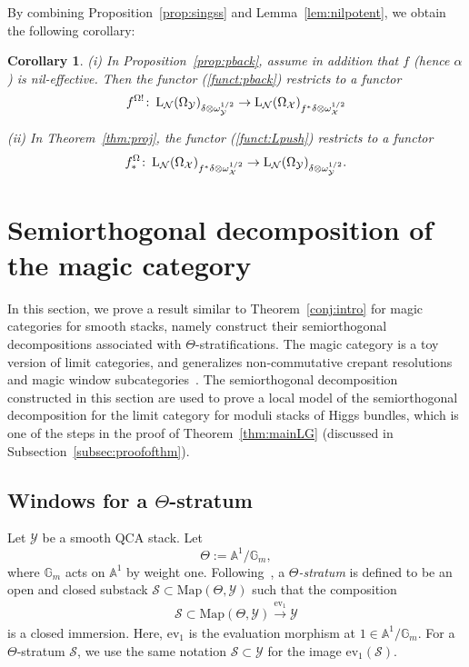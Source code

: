 \documentclass [11pt,oneside,a4paper,mathscr]{amsart}
\newtheorem{cor}[thm]{Corollary}
\theoremstyle{definition}
\newcommand{\Y}{\mathcal{Y}}
\newcommand{\LL}{\operatorname{L}}
\newcommand{\X}{\mathcal{X}}
\begin{document}
By combining Proposition~\ref{prop:singss} and Lemma~\ref{lem:nilpotent},
we obtain the following corollary: 
\begin{cor}\label{cor:nilp2}
(i) In Proposition~\ref{prop:pback}, assume in addition that $f$ (hence $\alpha$) is nil-effective. 
Then the functor (\ref{funct:pback}) restricts to a functor  
    \begin{align}\notag f^{\Omega!} \colon 
    \LL_{\mathcal{N}}(\Omega_{\Y})_{\delta\otimes \omega_{\Y}^{1/2}} \to \LL_{\mathcal{N}}(\Omega_{\X})_{f^{\ast}\delta \otimes \omega_{\X}^{1/2}}  
\end{align} 

(ii) In Theorem~\ref{thm:proj}, the functor (\ref{funct:Lpush}) restricts to a functor  
     \begin{align}\notag
        f^{\Omega}_{*} \colon 
    \LL_{\mathcal{N}}(\Omega_{\X})_{f^{\ast}\delta\otimes \omega_{\X}^{1/2}} \to \LL_{\mathcal{N}}(\Omega_{\Y})_{\delta \otimes \omega_{\Y}^{1/2}}. 
    \end{align}
\end{cor}

\section{Semiorthogonal decomposition of the magic category}\label{sec:magic}
In this section, we prove a result similar to Theorem~\ref{conj:intro} for magic categories for smooth stacks, namely 
construct their semiorthogonal decompositions associated with $\Theta$-stratifications. 
The magic category is a toy version of limit categories, and generalizes non-commutative 
crepant resolutions~\cite{SvdB} and magic window subcategories~\cite{hls}.
The semiorthogonal decomposition constructed in this section are used to prove a local model 
of the semiorthogonal decomposition for the limit category for moduli stacks of Higgs bundles, which is one of the steps in the proof of Theorem~\ref{thm:mainLG} (discussed in Subsection~\ref{subsec:proofofthm}). 




\subsection{\texorpdfstring{Windows for a $\Theta$-stratum}{Windows for a Theta-stratum}}\label{subsec:thetast}
Let $\mathcal{Y}$ be a smooth QCA stack.  
Let \[\Theta:=\mathbb{A}^1/\mathbb{G}_m,\] where 
$\mathbb{G}_m$ acts on $\mathbb{A}^1$ by weight one. 
Following~\cite{halpinstab}, a \textit{$\Theta$-stratum} is defined to be 
an open and 
closed substack 
$\mathcal{S} \subset \mathrm{Map}(\Theta, \mathcal{Y})$
such that the composition 
\begin{align*}
    \mathcal{S} \subset \mathrm{Map}(\Theta, \mathcal{Y}) 
   \stackrel{\mathrm{ev_1}}{\to} 
    \mathcal{Y}
\end{align*}
is a closed immersion.  
Here, $\mathrm{ev}_1$ is the evaluation morphism at 
$1 \in \mathbb{A}^1/\mathbb{G}_m$. 
For a $\Theta$-stratum $\mathcal{S}$, we use the 
same notation $\mathcal{S} \subset \mathcal{Y}$ 
for the image $\mathrm{ev}_1(\mathcal{S})$. 
\end{document}
